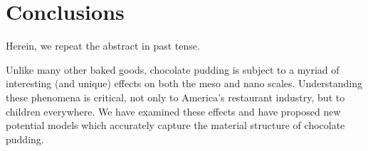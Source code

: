 \documentclass{ccr15}
\begin{document}
\section{Conclusions}
Herein, we repeat the abstract in past tense.

Unlike many other baked goods, chocolate pudding is subject to a myriad of interesting (and unique) effects on both the
meso and nano scales.  Understanding these phenomena is critical, not only to America's restaurant industry, but to
children everywhere.  We have examined these effects and have proposed new potential models which accurately capture
the material structure of chocolate pudding.


\nocite{ZAB:Mentor05}


%
\end{document}
